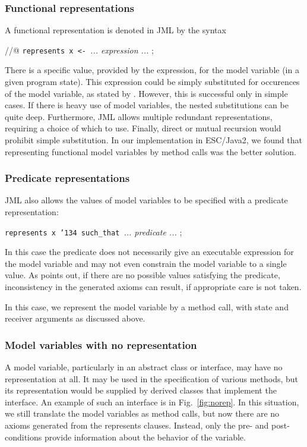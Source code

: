 \documentclass{sig-alternate}
\begin{document}
\subsubsection {Functional representations}

A functional representation is denoted in JML by the syntax
\begin{center} //@ \texttt{represents x <- }{\em ... expression ... } ; \end{center}
There is a specific value, provided by the expression, for the model variable (in a given program 
state).   This expression could be simply substituted for occurences of the model variable, as
stated by \cite{BreunessePoll03}.  However, this is successful only in simple cases.  If there
is heavy use of model variables, the nested substitutions can be quite deep.  Furthermore,
JML allows multiple redundant representations, requiring a choice of which to use.  Finally,
direct or mutual recursion would prohibit simple substitution.  In our implementation in
ESC/Java2, we found that representing functional model variables by method
calls was the better
solution.

\subsubsection{Predicate representations}

JML also allows the values of model variables to be specified with a predicate representation:
\begin{center} \texttt{represents x \char'134 such\_that }{\em ... predicate ... } ; \end{center}
In this case the predicate does not necessarily give an executable expression for the
model variable and may not even constrain the model variable to a single value.  As
\cite{BreunessePoll03} points out, if there are no possible values satisfying the predicate, 
inconsistency in the generated axioms can result, if appropriate care is not taken.

In this case, we represent the model variable by a method call, with state and receiver arguments
as discussed above.

\subsubsection{Model variables with no representation}

A model variable, particularly in an abstract class or interface, may have no representation
at all.  It may be used in the specification of various methods, but its representation would be
supplied by derived classes that implement the interface.  An example of such an interface is
in Fig.~\ref{fig:norep}.  In this situation, we still translate the model variables as method calls,
but now there are no axioms generated from the represents clauses.  Instead, only the
pre- and post-conditions provide information about the behavior of the variable.
\end{document}
